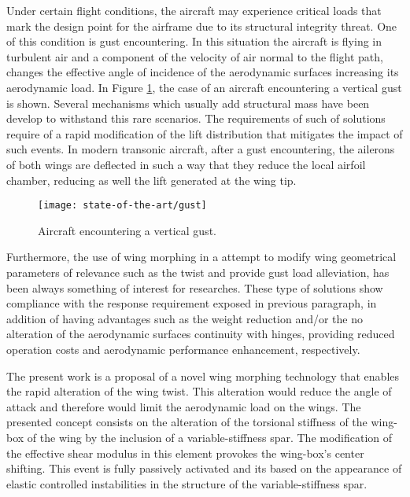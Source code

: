 Under certain flight conditions, the aircraft may experience critical loads that mark the design point for the airframe due to its structural integrity threat. One of this condition is gust encountering. In this situation the aircraft is flying in turbulent air and a component of the velocity of air normal to the flight path, changes the effective angle of incidence of the aerodynamic surfaces increasing its aerodynamic load. In Figure \ref{fig:gust}, the case of an aircraft encountering a vertical gust is shown. Several mechanisms which usually add structural mass have been develop to withstand this rare scenarios. The requirements of such of solutions require of a rapid modification of the lift distribution that mitigates the impact of such events. In modern transonic aircraft, after a gust encountering, the ailerons of both wings are deflected in such a way that they reduce the local airfoil chamber, reducing as well the lift generated at the wing tip.

\begin{figure}[!htpb]
  \centering
  \texttt{[image: state-of-the-art/gust]}
  \caption[Aircraft encountering a vertical gust]{Aircraft encountering a vertical gust. \cite{JECooper2007}}\label{fig:gust}
\end{figure}

Furthermore, the use of wing morphing in a attempt to modify wing geometrical parameters of relevance such as the twist and provide gust load alleviation, has been always something of interest for researches. These type of solutions show compliance with the response requirement exposed in  previous paragraph, in addition of having advantages such as the weight reduction and/or the no alteration of the aerodynamic surfaces continuity with hinges, providing reduced operation costs and aerodynamic performance enhancement, respectively. 

The present work is a proposal of a novel wing morphing technology that enables the rapid alteration of the wing twist. This alteration would reduce the angle of attack and therefore would limit the aerodynamic load on the wings. The presented concept consists on the alteration of the torsional stiffness of the wing-box of the wing by the inclusion of a variable-stiffness spar. The modification of the effective shear modulus in this element provokes the wing-box's center shifting. This event is fully passively activated and its based on the appearance of elastic controlled instabilities in the structure of the variable-stiffness spar.

